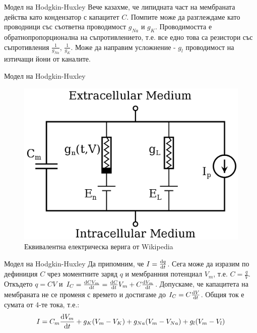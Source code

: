 \begin{frame}[t]{Модел на Hodgkin-Huxley}
  Вече казахме, че липидната част на мембраната действа като кондензатор с капацитет $C$. 
  Помпите може да разглеждаме като проводници със съответна проводимост $g_{Na}$ и $g_{K}$.
  Проводимостта е обратнопропорционална на съпротивлението, 
  т.е. все едно това са резистори със съпротивления $\frac{1}{g_{Na}}$, $\frac{1}{g_{K}}$.
  Може да направим усложнение - $g_{l}$ проводимост на изтичащи йони от каналите. 
\end{frame}

\begin{frame}[t]{Модел на Hodgkin-Huxley}
  \begin{figure}[htbp!]
      \centering
      \includegraphics[width=\textwidth,height=0.7\textheight,keepaspectratio]{img/hodgkin-huxley/circuit.png}
      \caption{Еквивалентна електрическа верига от Wikipedia}
  \end{figure}
\end{frame}

\begin{frame}[t]{Модел на Hodgkin-Huxley}
  Да припомним, че $I = \dv{q}{t}$. 
  Сега може да изразим по дефиниция $C$ чрез моментните заряд $q$ и мембранния потенциал $V_m$, т.е. $C = \frac{q}{V}$.
  Откъдето $q = C V$ и $I_C = \dv{C V_m}{t} = \dv{C}{t}V_m + C\dv{V_m}{t}$. 
  Допускаме, че капацитета на мембраната не се променя с времето и достигаме до $I_C = C\dv{V}{t}$.
  Общия ток е сумата от 4-те тока, т.е.:
  \begin{equation*}
    I=C_{m}\dv{V_m}{t}+g_{K}(V_{m}-V_{K})+g_{Na}(V_{m}-V_{Na})+g_{l}(V_{m}-V_{l})
  \end{equation*}
\end{frame}

